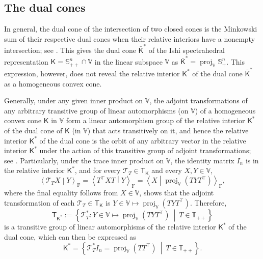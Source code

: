 \documentclass[oneside]{amsart}
\theoremstyle{plain}
\theoremstyle{definition}
\theoremstyle{remark}
\numberwithin{equation}{section}
\DeclareMathOperator{\proj}{proj}
\begin{document}
\subsection{ The dual cones}
\label{section:dualcones}

In general, the dual cone of the intersection of two closed cones is the
Minkowski sum of their respective dual cones when their relative interiors
have a nonempty intersection; see \cite[Corollary~16.4.2]{Rock97}. This
gives the dual cone $\bar{\mathsf{K}}^{*}$ of the Ishi spectrahedral
representation $\mathsf{K} = \mathbb{S}^{n}_{++} \cap \mathbb{V}$ in the
linear subspace $\mathbb{V}$ as $\bar{\mathsf{K}}^{*} = \proj_{\mathbb{V}}
\mathbb{S}^{n}_{+}$. This expression, however, does not reveal the relative
interior $\mathsf{K}^{*}$ of the dual cone $\bar{\mathsf{K}}^{*}$ as a
homogeneous convex cone.

Generally, under any given inner product on $\mathbb{V}$, the adjoint
transformations of any arbitrary transitive group of linear automorphisms
(on $\mathbb{V}$) of a homogeneous convex cone $\mathsf{K}$ in $\mathbb{V}$
form a linear automorphism group of the relative interior $\mathsf{K}^{*}$
of the dual cone of $\mathsf{K}$ (in $\mathbb{V}$) that acts transitively
on it, and hence the relative interior $\mathsf{K}^{*}$ of the dual cone is
the orbit of any arbitrary vector in the relative interior $\mathsf{K}^{*}$
under the action of this transitive group of adjoint transformations; see
\cite[Proposition~I.4.9]{Vin65}. Particularly, under the trace inner
product on $\mathbb{V}$, the identity matrix $I_{n}$ is in the relative
interior $\mathsf{K}^{*}$, and for every $\mathcal{T}_{T} \in
\mathsf{T}_{\mathsf{K}}$ and every $X, Y \in \mathbb{V}$,
\[
\left\langle \mathcal{T}_{T} X \middle| Y \right\rangle_{\mathrm{F}} =
\left\langle T^{\top} X T \middle| Y \right\rangle_{\mathrm{F}} =
\left\langle X \middle| \proj_{\mathbb{V}}\left( T Y T^{\top} \right)
\right\rangle_{\mathrm{F}},
\]
where the final equality follows from $X \in \mathbb{V}$, shows that the
adjoint transformation of each $\mathcal{T}_{T} \in
\mathsf{T}_{\mathsf{K}}$ is $Y \in \mathbb{V} \mapsto
\proj_{\mathbb{V}}\left( T Y T^{\top} \right)$. Therefore,
\[ \mathsf{T}_{\mathsf{K}^{*}} :=
\left\{\mathcal{T}^{*}_{T} : Y \in \mathbb{V} \mapsto
\proj_{\mathbb{V}}\left( T Y T^{\top} \right)\ \middle|\ T \in
\mathbb{T}_{++}\right\}
\]
is a transitive group of linear automorphisms of the relative interior
$\mathsf{K}^{*}$ of the dual cone, which can then be expressed as
\[
\mathsf{K}^{*} = \left\{\mathcal{T}^{*}_{T} I_{n} =
\proj_{\mathbb{V}}\left( T T^{\top} \right)\ \middle|\ T \in
\mathbb{T}_{++}\right\}.
\]
\end{document}

